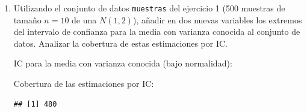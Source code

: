 \documentclass[
]{book}
\newenvironment{Shaded}{\begin{snugshade}}{\end{snugshade}}
\newcommand{\CommentTok}[1]{\textcolor[rgb]{0.56,0.35,0.01}{\textit{#1}}}
\newcommand{\DecValTok}[1]{\textcolor[rgb]{0.00,0.00,0.81}{#1}}
\newcommand{\FloatTok}[1]{\textcolor[rgb]{0.00,0.00,0.81}{#1}}
\newcommand{\FunctionTok}[1]{\textcolor[rgb]{0.00,0.00,0.00}{#1}}
\newcommand{\NormalTok}[1]{#1}
\newcommand{\OtherTok}[1]{\textcolor[rgb]{0.56,0.35,0.01}{#1}}
\newcommand{\SpecialCharTok}[1]{\textcolor[rgb]{0.00,0.00,0.00}{#1}}
\theoremstyle{break}
\theoremstyle{definition}
\theoremstyle{definition}
\theoremstyle{definition}
\theoremstyle{definition}
\theoremstyle{remark}
\begin{document}
\begin{enumerate}
\def\labelenumi{\alph{enumi})}
\item
  Utilizando el conjunto de datos \texttt{muestras} del ejercicio 1 (500
  muestras de tamaño \(n=10\) de una \(N(1,2)\)), añadir en dos nuevas
  variables los extremos del intervalo de confianza para la media
  con varianza conocida al conjunto de datos. Analizar la
  cobertura de estas estimaciones por IC.

  IC para la media con varianza conocida (bajo normalidad):

\begin{Shaded}
\end{Shaded}

  Cobertura de las estimaciones por IC:

\begin{Shaded}
\end{Shaded}

\begin{verbatim}
## [1] 480
\end{verbatim}


\end{enumerate}
\end{document}
